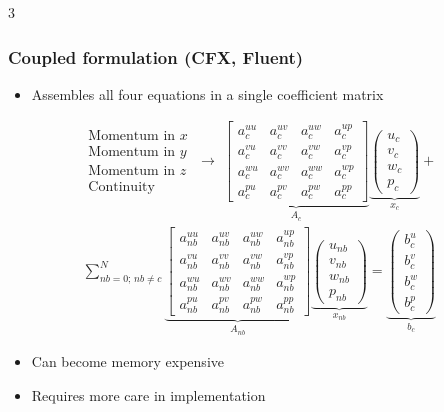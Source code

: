 \documentclass[landscape, a4paper]{article}
\begin{document}
\begin{multicols*}{3}
\subsubsection{Coupled formulation (CFX, Fluent)}
\begin{itemize}
  \item Assembles all four equations in a single coefficient matrix
\end{itemize}
\[
\begin{gathered}
  \begin{array}{r}
    \text{Momentum in }x\\
    \text{Momentum in }y\\
    \text{Momentum in }z\\
    \text{Continuity}
  \end{array}
  \;\rightarrow\;
  \underbrace{
    \begin{bmatrix}
      a_c^{uu} & a_c^{uv} & a_c^{uw} & a_c^{up}\\
      a_c^{vu} & a_c^{vv} & a_c^{vw} & a_c^{vp}\\
      a_c^{wu} & a_c^{wv} & a_c^{ww} & a_c^{wp}\\
      a_c^{pu} & a_c^{pv} & a_c^{pw} & a_c^{pp}
    \end{bmatrix}
  }_{A_c}
  \underbrace{
    \begin{pmatrix}u_c\\v_c\\w_c\\p_c\end{pmatrix}
  }_{x_c}
  +\\
  \sum_{nb=0;\,nb\ne c}^{N}
  \underbrace{
    \begin{bmatrix}
      a_{nb}^{uu} & a_{nb}^{uv} & a_{nb}^{uw} & a_{nb}^{up}\\
      a_{nb}^{vu} & a_{nb}^{vv} & a_{nb}^{vw} & a_{nb}^{vp}\\
      a_{nb}^{wu} & a_{nb}^{wv} & a_{nb}^{ww} & a_{nb}^{wp}\\
      a_{nb}^{pu} & a_{nb}^{pv} & a_{nb}^{pw} & a_{nb}^{pp}
    \end{bmatrix}
  }_{A_{nb}}
  \underbrace{
    \begin{pmatrix}u_{nb}\\v_{nb}\\w_{nb}\\p_{nb}\end{pmatrix}
  }_{x_{nb}}
  =
  \underbrace{
    \begin{pmatrix}b_c^u\\b_c^v\\b_c^w\\b_c^p\end{pmatrix}
  }_{b_c}
\end{gathered}
\]
\begin{itemize}
  \item Can become memory expensive
  \item Requires more care in implementation
\end{itemize}


\end{multicols*}
\end{document}
